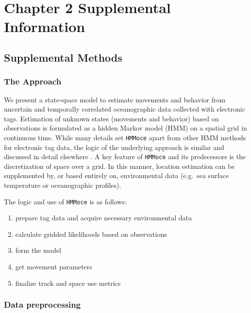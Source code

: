 
\chapter{Chapter 2 Supplemental Information}
\label{sec:app2}
\raggedbottom




\clearpage

\section{Supplemental Methods}

\subsection*{The Approach}

We present a state-space model to estimate movements and behavior from
uncertain and temporally correlated oceanographic data collected with
electronic tags. Estimation of unknown states (movements and behavior)
based on observations is formulated as a hidden Markov model (HMM) on a
spatial grid in continuous time. While many details set \texttt{HMMoce}
apart from other HMM methods for electronic tag data, the logic of the
underlying approach is similar and discussed in detail elsewhere
\citep{Pedersen2008, Pedersen2011, Thygesen2009a}. A key feature of
\texttt{HMMoce} and its predecessors is the discretization of space over
a grid. In this manner, location estimation can be supplemented by, or
based entirely on, environmental data (e.g.~sea surface temperature or
oceanographic profiles).

The logic and use of \texttt{HMMoce} is as follows: 
\begin{enumerate}[itemsep=-1mm]
    \item prepare tag data and acquire necessary environmental data
    \item calculate gridded likelihoods based on observations
    \item form the model
    \item get movement parameters
    \item finalize track and space use metrics
\end{enumerate}

\subsection*{Data preprocessing}%


